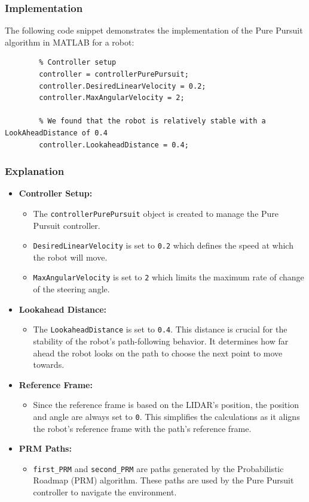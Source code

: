 \documentclass{article}
\begin{document}
	\subsubsection*{Implementation}
	The following code snippet demonstrates the implementation of the Pure Pursuit algorithm in MATLAB for a robot:
	\begin{verbatim}
		% Controller setup
		controller = controllerPurePursuit;
		controller.DesiredLinearVelocity = 0.2;
		controller.MaxAngularVelocity = 2;
		
		% We found that the robot is relatively stable with a LookAheadDistance of 0.4
		controller.LookaheadDistance = 0.4;
	\end{verbatim}
	
	\subsubsection*{Explanation}
	\begin{itemize}
		\item \textbf{Controller Setup:}
		\begin{itemize}
			\item The \texttt{controllerPurePursuit} object is created to manage the Pure Pursuit controller.
			\item \texttt{DesiredLinearVelocity} is set to \texttt{0.2} which defines the speed at which the robot will move.
			\item \texttt{MaxAngularVelocity} is set to \texttt{2} which limits the maximum rate of change of the steering angle.
		\end{itemize}
		\item \textbf{Lookahead Distance:}
		\begin{itemize}
			\item The \texttt{LookaheadDistance} is set to \texttt{0.4}. This distance is crucial for the stability of the robot's path-following behavior. It determines how far ahead the robot looks on the path to choose the next point to move towards.
		\end{itemize}
		\item \textbf{Reference Frame:}
		\begin{itemize}
			\item Since the reference frame is based on the LIDAR's position, the position and angle are always set to \texttt{0}. This simplifies the calculations as it aligns the robot's reference frame with the path's reference frame.
		\end{itemize}
		\item \textbf{PRM Paths:}
		\begin{itemize}
			\item \texttt{first\_PRM} and \texttt{second\_PRM} are paths generated by the Probabilistic Roadmap (PRM) algorithm. These paths are used by the Pure Pursuit controller to navigate the environment.
		\end{itemize}
	\end{itemize}
\end{document}
